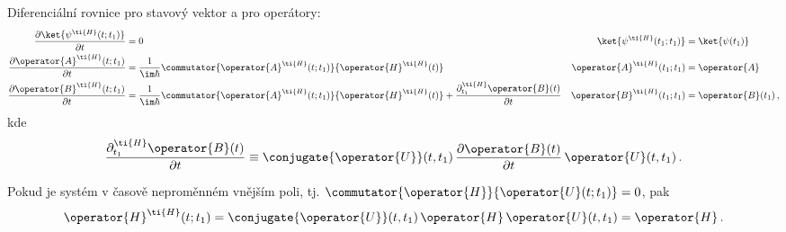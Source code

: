 \begin{enumerate}
    Diferenciální rovnice pro stavový vektor a pro operátory:
    \begin{subequations}
        \begin{align}
            \frac{\partial\ket{\psi^{\ti{H}}(t;t_{1})}}{\partial t}
                &=0 
                &\ket{\psi^{\ti{H}}(t_{1};t_{1})}
                &=\ket{\psi(t_{1})}\\
            \frac{\partial\operator{A}^{\ti{H}}(t;t_{1})}{\partial t}
                &=\frac{1}{\im\hbar}\commutator{\operator{A}^{\ti{H}}(t;t_{1})}{\operator{H}^{\ti{H}}(t)}
                &\operator{A}^{\ti{H}}(t_{1};t_{1})
                &=\operator{A}\\
            \frac{\partial\operator{B}^{\ti{H}}(t;t_{1})}{\partial t}
                &=\frac{1}{\im\hbar}\commutator{\operator{A}^{\ti{H}}(t;t_{1})}{\operator{H}^{\ti{H}}(t)}
                    +\frac{\partial^{\ti{H}}_{t_{1}}\operator{B}(t)}{\partial t}
                &\operator{B}^{\ti{H}}(t_{1};t_{1})
                &=\operator{B}(t_{1})\,,
        \end{align}            
    \end{subequations}
    kde 
    \begin{equation}
        \frac{\partial^{\ti{H}}_{t_{1}}\operator{B}(t)}{\partial t}
            \equiv\conjugate{\operator{U}}(t,t_{1})\,\frac{\partial\operator{B}(t)}{\partial t}\,\operator{U}(t,t_{1})\,.
    \end{equation}
    
    Pokud je systém v časově neproměnném vnějším poli, tj. $\commutator{\operator{H}}{\operator{U}(t;t_{1})}=0$, pak
    \begin{equation}
        \operator{H}^{\ti{H}}(t;t_{1})
            =\conjugate{\operator{U}}(t,t_{1})\,\operator{H}\,\operator{U}(t,t_{1})
            =\operator{H}\,.
    \end{equation}


\end{enumerate}
